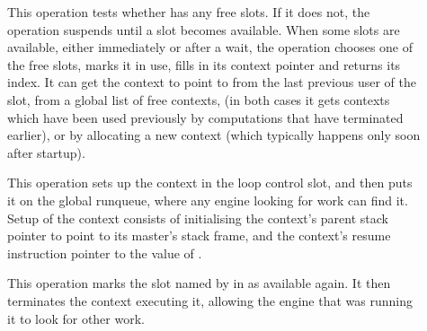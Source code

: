 \begin{description}
\item[]
This operation tests whether \LC{} has any free slots.
If it does not, the operation suspends until a slot becomes available.
When some slots are available, either immediately or after a wait,
the operation chooses one of the free slots, marks it in use,
fills in its context pointer and returns its index.
It can get the context to point to
from the last previous user of the slot,
from a global list of free contexts,
(in both cases it gets contexts which have been used previously
by computations that have terminated earlier),
or by allocating a new context
(which typically happens only soon after startup).

\item[]
This operation sets up the context in the loop control slot,
and then puts it on the global runqueue,
where any engine looking for work can find it.
Setup of the context consists of initialising the context's parent stack
pointer to point to its master's stack frame,
and the context's resume instruction pointer to the value of .

\item[]
This operation marks the slot named by \LCS{} in \LC{} as available again.
It then terminates the context executing it,
allowing the engine that was running it to look for other work.


\end{description}
